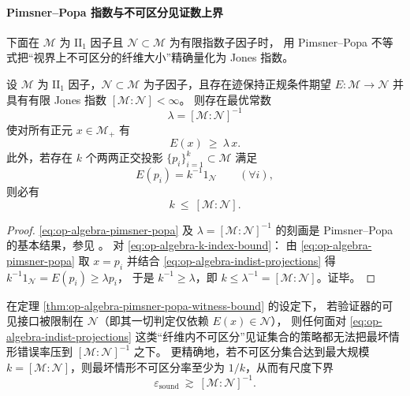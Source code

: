 \paragraph{Pimsner--Popa 指数与不可区分见证数上界}
下面在 \(\mathcal{M}\) 为 \(\mathrm{II}_1\) 因子且 \(\mathcal{N}\subset\mathcal{M}\) 为有限指数子因子时，
用 Pimsner--Popa 不等式把“视界上不可区分的纤维大小”精确量化为 Jones 指数。

\begin{theorem}\label{thm:op-algebra-pimsner-popa-witness-bound}
设 \(\mathcal{M}\) 为 \(\mathrm{II}_1\) 因子，\(\mathcal{N}\subset\mathcal{M}\) 为子因子，且存在迹保持正规条件期望 \(E:\mathcal{M}\to\mathcal{N}\) 并具有有限 Jones 指数 \([\mathcal{M}:\mathcal{N}]<\infty\)。
则存在最优常数
\[
\lambda=[\mathcal{M}:\mathcal{N}]^{-1}
\]
使对所有正元 \(x\in\mathcal{M}_+\) 有
\begin{equation}\label{eq:op-algebra-pimsner-popa}
\boxed{\;E(x)\ \ge\ \lambda\,x.\;}
\end{equation}
此外，若存在 \(k\) 个两两正交投影 \(\{p_i\}_{i=1}^k\subset\mathcal{M}\) 满足
\begin{equation}\label{eq:op-algebra-indist-projections}
\boxed{\;E(p_i)=k^{-1}1_{\mathcal{N}}\qquad(\forall i),\;}
\end{equation}
则必有
\begin{equation}\label{eq:op-algebra-k-index-bound}
\boxed{\;k\ \le\ [\mathcal{M}:\mathcal{N}].\;}
\end{equation}
\end{theorem}

\begin{proof}
\eqref{eq:op-algebra-pimsner-popa} 及 \(\lambda=[\mathcal{M}:\mathcal{N}]^{-1}\) 的刻画是 Pimsner--Popa 的基本结果，参见 \cite{PimsnerPopa1986EntropyIndexSubfactors}。
对 \eqref{eq:op-algebra-k-index-bound}：
由 \eqref{eq:op-algebra-pimsner-popa} 取 \(x=p_i\) 并结合 \eqref{eq:op-algebra-indist-projections} 得
\(
k^{-1}1_{\mathcal{N}}=E(p_i)\ge \lambda p_i
\)，
于是 \(k^{-1}\ge\lambda\)，即 \(k\le \lambda^{-1}=[\mathcal{M}:\mathcal{N}]\)。证毕。
\end{proof}

\begin{corollary}\label{cor:op-algebra-soundness-lower-bound-index}
在定理 \ref{thm:op-algebra-pimsner-popa-witness-bound} 的设定下，
若验证器的可见接口被限制在 \(\mathcal{N}\)（即其一切判定仅依赖 \(E(x)\in\mathcal{N}\)），
则任何面对 \eqref{eq:op-algebra-indist-projections} 这类“纤维内不可区分”见证集合的策略都无法把最坏情形错误率压到
\([\mathcal{M}:\mathcal{N}]^{-1}\) 之下。
更精确地，若不可区分集合达到最大规模 \(k=[\mathcal{M}:\mathcal{N}]\)，则最坏情形不可区分率至少为 \(1/k\)，从而有尺度下界
\[
\boxed{\;\varepsilon_{\mathrm{sound}}\ \gtrsim\ [\mathcal{M}:\mathcal{N}]^{-1}.\;}
\]
\end{corollary}

